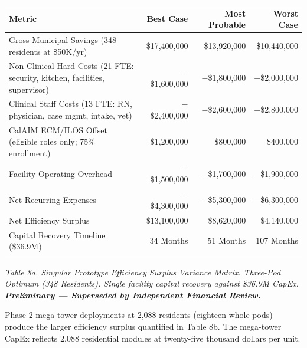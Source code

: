 \documentclass[12pt, letterpaper]{article}
\begin{document}
{\singlespacing
\begin{tabularx}{\textwidth}{@{}lrrr@{}}
\toprule
\rowcolor{rowgray}
Metric & Best Case & Most Probable & Worst Case \\
\midrule
Gross Municipal Savings (348 residents at \$50K/yr) & \$17,400,000 & \$13,920,000 & \$10,440,000 \\
\rowcolor{rowgray}
Non-Clinical Hard Costs (21 FTE: security, kitchen, facilities, supervisor) & $-$\$1,600,000 & $-$\$1,800,000 & $-$\$2,000,000 \\
Clinical Staff Costs (13 FTE: RN, physician, case mgmt, intake, vet) & $-$\$2,400,000 & $-$\$2,600,000 & $-$\$2,800,000 \\
\rowcolor{rowgray}
CalAIM ECM/ILOS Offset (eligible roles only; 75\% enrollment) & \$1,200,000 & \$800,000 & \$400,000 \\
Facility Operating Overhead & $-$\$1,500,000 & $-$\$1,700,000 & $-$\$1,900,000 \\
\rowcolor{rowgray}
Net Recurring Expenses & $-$\$4,300,000 & $-$\$5,300,000 & $-$\$6,300,000 \\
Net Efficiency Surplus & \$13,100,000 & \$8,620,000 & \$4,140,000 \\
\rowcolor{rowgray}
Capital Recovery Timeline (\$36.9M) & 34 Months & 51 Months & 107 Months \\
\addlinespace[4pt]
\bottomrule
\end{tabularx}\par
\vspace{8pt}
\noindent\textit{Table 8a. Singular Prototype Efficiency Surplus Variance Matrix. Three-Pod Optimum (348 Residents). Single facility capital recovery against \$36.9M CapEx. \textbf{Preliminary --- Superseded by Independent Financial Review.}}
\par}

Phase 2 mega-tower deployments at 2,088 residents (eighteen whole pods) produce the larger efficiency surplus quantified in Table 8b. The mega-tower CapEx reflects 2,088 residential modules at twenty-five thousand dollars per unit.
\end{document}
